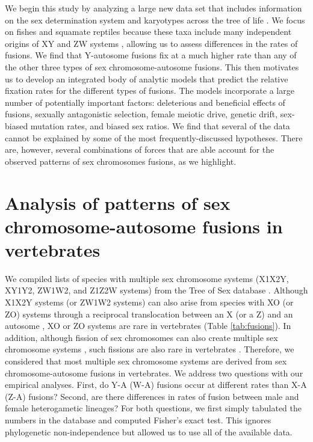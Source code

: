 We begin this study by analyzing a large new data set that includes information on the sex determination system and karyotypes across the tree of life \citep{ToS}. We focus on fishes and squamate reptiles because these taxa include many independent origins of XY and ZW systems \citep{Ezaz2009, Kitano2012}, allowing us to assess differences in the rates of fusions. We find that Y-autosome fusions fix at a much higher rate than any of the other three types of sex chromosome-autosome fusions. This then motivates us to develop an integrated body of analytic models that predict the relative fixation rates for the different types of fusions. The models incorporate a large number of potentially important factors: deleterious and beneficial effects of fusions, sexually antagonistic selection, female meiotic drive, genetic drift, sex-biased mutation rates, and biased sex ratios. We find that several of the data cannot be explained by some of the most frequently-discussed hypotheses. There are, however, several combinations of forces that are able account for the observed patterns of sex chromosomes fusions, as we highlight.

\section{Analysis of patterns of sex chromosome-autosome fusions in vertebrates}

We compiled lists of species with multiple sex chromosome systems (X1X2Y, XY1Y2, ZW1W2, and Z1Z2W systems) from the Tree of Sex database \citep{ToS}. Although X1X2Y systems (or ZW1W2 systems) can also arise from species with XO (or ZO) systems through a reciprocal translocation between an X (or a Z) and an autosome \citep{White1973, Kitano2012}, XO or ZO systems are rare in vertebrates \citep{ToS} (Table \ref{tab:fusions}). In addition, although fission of sex chromosomes can also create multiple sex chromosome systems \citep{White1973, Kitano2012}, such fissions are also rare in vertebrates \citep{Ohno1967, Kitano2012, Yoshida2012}. Therefore, we considered that most multiple sex chromosome systems are derived from sex chromosome-autosome fusions in vertebrates. We address two questions with our empirical analyses. First, do Y-A (W-A) fusions occur at different rates than X-A (Z-A) fusions? Second, are there differences in rates of fusion between male and female heterogametic lineages? For both questions, we first simply tabulated the numbers in the database and computed Fisher's exact test. This ignores phylogenetic non-independence but allowed us to use all of the available data. 

